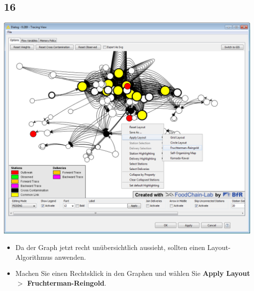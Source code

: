 \documentclass{beamer}
\begin{document}
\subsection{16}
\begin{frame}
	\begin{center}
  		\includegraphics[height=0.6\textheight]{16.png}
	\end{center}
	\begin{itemize}
		\item Da der Graph jetzt recht unübersichtlich aussieht, sollten einen Layout-Algorithmus anwenden.
		\item Machen Sie einen Rechtsklick in den Graphen und wählen Sie \textbf{Apply Layout $>$ Fruchterman-Reingold}.
	\end{itemize}
\end{frame}
\end{document}
